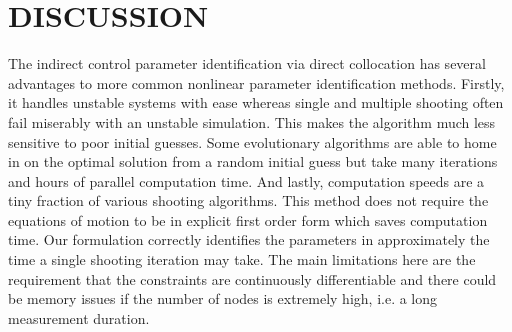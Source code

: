 \documentclass[11pt,a4paper,twocolumn]{article}
\newcommand*{\ElevenPtFont}{%
      \fontsize{11}{20}%
      \selectfont}
\begin{document}
\section*{\ElevenPtFont DISCUSSION}

The indirect control parameter identification via direct collocation has
several advantages to more common nonlinear parameter identification methods.
Firstly, it handles unstable systems with ease whereas single and multiple
shooting often fail miserably with an unstable simulation. This makes the
algorithm much less sensitive to poor initial guesses. Some evolutionary
algorithms are able to home in on the optimal solution from a random initial
guess but take many iterations and hours of parallel computation time.  And
lastly, computation speeds are a tiny fraction of various shooting algorithms.
This method does not require the equations of motion to be in explicit first
order form which saves computation time. Our formulation correctly identifies
the parameters in approximately the time a single shooting iteration may take.
The main limitations here are the requirement that the constraints are
continuously differentiable and there could be memory issues if the number of
nodes is extremely high, i.e. a long measurement duration.




\end{document}
